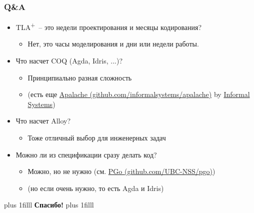 \documentclass[
  11pt,aspectratio=169,pdf,hyperref={unicode,colorlinks=false}
]{beamer}
\def\TLA{TLA\textsuperscript{+}}
\begin{document}
\begin{frame}[t]
  \frametitle{Q\&A}
  \begin{itemize}
    \item \TLA\ -- это недели проектирования и месяцы кодирования?
    \begin{itemize}
      \item Нет, это часы моделирования и дни или недели работы.
    \end{itemize}
    \item Что насчет COQ (Agda, Idris, ...)?
    \begin{itemize}
      \item Принципиально разная сложность
      \item (есть еще \href{https://github.com/informalsystems/apalache}{Apalache ({\ttfamily github.com/informalsystems/apalache})} by \href{https://informal.systems/}{Informal Systems})
    \end{itemize}
    \item Что насчет Alloy?
    \begin{itemize}
      \item Тоже отличный выбор для инженерных задач
    \end{itemize}
    \item Можно ли из спецификации сразу делать код?
    \begin{itemize}
      \item Можно, но не нужно (см. \href{https://github.com/UBC-NSS/pgo}{PGo ({\ttfamily github.com/UBC-NSS/pgo})})
      \item (но если очень нужно, то есть Agda и Idris)
    \end{itemize}
  \end{itemize}
\end{frame}

\newcommand{\btVFill}{\vskip0pt plus 1filll}
\begin{frame}
  \centering%
  \btVFill%
  {\Huge\bf Спасибо!}
  \btVFill%
\end{frame}
\end{document}
